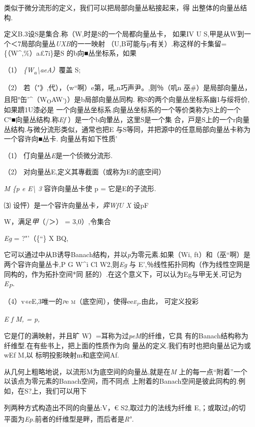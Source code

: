 \documentclass{article}
\begin{document}
类似于微分流形的定义，我们可以把局部向量丛粘接起来，得
出整体的向量丛结构.

定义B.3设S是集合.称（W,时是S的一个局都向量丛卡， 如果IV U
S,甲是从W到一个＜7局部向量丛\emph{UXB}的一一映射
（U,B可能与p有关）.称这样的卡集留=\{（W\^{},\%）\textbar{}a£7i\}是S
的b向■丛坐标系，如果

（1） \emph{\{W\textsubscript{a}\textbackslash{}aeA）}覆盖 S;

（2） 若（"》,代），（w``啊）e第，吼,n巧声尹。,则％（叽n
巫\#）是局部向量丛，且阳°缶'\^{}（W\textsubscript{O}AW\textsuperscript{,}\textsubscript{\textbar{}）}）是b局部向量丛同构.
称S的两个向量丛坐标系幽1与绥将价,如果躋1U漆必是
一个向量丛坐标系.向量丛坐标系的一个等价类称为S上的一个
C°■向量丛结构.称\emph{Ef} ）是一个b向暈丛，这里S是一个集
合，戸是S上的一个r向量丛结构.与微分流形类似，通常也把E
与S等同，并把源中的任意局部向量丛卡称为一个容许向■丛卡.
向量丛有如下性质'

（1） 仃向量丛\emph{E}是一个侦微分流形.

（2） 对向量丛E,定义其專截面（或称为E的底空间）

\emph{M \{p e E\textbackslash{} 3} 容许向量丛卡使 p = 它是E的子流形.

⑶ 设怦）是一个容许向量丛卡\emph{，弈WfU X} 设pF

W，满足\emph{甲}（/＞） = 3,0）,令集合

\emph{Eg} = ?"'（\{``\} X BQ,

它可以通过中从B诱导Banach结构，并以\emph{p}为零元素.如果（Wi,
ft）和（巫``啊）是两个容许向量丛卡,P G W\^{}i Cl W2,则\emph{Eg} 与
E',％线性拓扑同构（作为线性空网是同构的，作为拓扑空间*同
胚的）.在这个意义下，可以认为Eg与甲无关,可记为\emph{E\textsubscript{P}.}

（4）v«eE,3唯一的\emph{\textsc{p}}e
\textsc{m}（底空间），使得ee\emph{\textsc{e\textsubscript{p}.}}由此，
可定义投彩

\emph{E f M, = p,}

它是仃的满映射，并且旷 W）=耳称为过\emph{peM}的纤维，它具
有的Banach结构称为纤维型.在有些书上，把上面的性质作为向
量丛的定义.我们有时也把向量丛记为或wEf M,以 标明投影映射m和底空间Af.

从几何上粗略地说，以流形M为底空间的向量丛,就是在\emph{M}
上的每一点``附着''一个以该点为零元素的Banach空间，而不同点
上附着的Banach空间是彼此同构的.例如，在S?上，我们可以用下

列两种方式构造出不同的向量丛:V，€ S2,取过力的法线为纤维
E,；或取过\emph{p}的切平面为\emph{Ep.}前者的纤维型是畔，而后者是\emph{R\textsuperscript{s}.}
\end{document}
